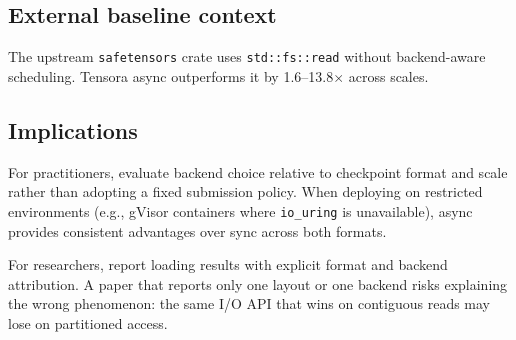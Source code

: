 \subsection{External baseline context}

The upstream \texttt{safetensors} crate uses \texttt{std::fs::read} without backend-aware scheduling. Tensora async outperforms it by 1.6--13.8$\times$ across scales.

\subsection{Implications}

For practitioners, evaluate backend choice relative to checkpoint format and scale rather than adopting a fixed submission policy. When deploying on restricted environments (e.g., gVisor containers where \texttt{io\_uring} is unavailable), async provides consistent advantages over sync across both formats.

For researchers, report loading results with explicit format and backend attribution. A paper that reports only one layout or one backend risks explaining the wrong phenomenon: the same I/O API that wins on contiguous reads may lose on partitioned access.
